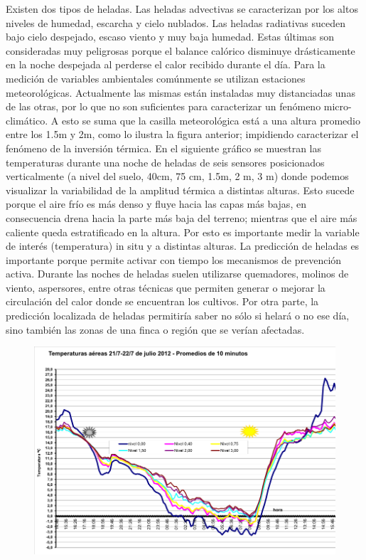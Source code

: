 \documentclass[final,a4paper]{llncs}
\begin{document}
Existen dos tipos de heladas. Las heladas advectivas se caracterizan por los
 altos niveles de humedad, escarcha y cielo nublados. Las heladas radiativas suceden 
 bajo cielo despejado, escaso viento y muy baja humedad. Estas últimas son consideradas muy peligrosas
 porque el balance calórico disminuye drásticamente en la noche despejada al perderse el 
 calor recibido durante el día. Para la medición de variables ambientales comúnmente se utilizan estaciones meteorológicas. Actualmente las mismas están instaladas muy distanciadas unas de las otras, por lo que no son suficientes para 
caracterizar un fenómeno micro-climático. A esto se suma que la casilla meteorológica está
a una altura promedio entre los 1.5m y 2m, como lo ilustra la figura\cite{saavedraTesis} anterior; impidiendo
 caracterizar el fenómeno de la inversión térmica. En el siguiente gráfico \cite{pid-fca-uncu-dataset}
 se muestran las temperaturas durante una noche de heladas de seis sensores 
posicionados verticalmente (a nivel del suelo, 40cm, 75 cm, 1.5m, 2 m, 3 m) donde 
podemos visualizar la variabilidad de la amplitud térmica a distintas alturas. 
Esto sucede porque el aire frío es más denso y fluye hacia las capas más bajas, 
en consecuencia drena hacia la parte más baja del terreno; mientras que 
el aire más caliente queda estratificado en la 
altura. Por esto es importante medir la variable de interés (temperatura) in situ y a distintas
alturas.
La predicción de heladas es importante porque permite activar con tiempo los mecanismos de 
prevención activa. Durante las noches de heladas suelen utilizarse quemadores, molinos de viento,
aspersores, entre otras técnicas que permiten generar o mejorar la circulación del calor donde 
se encuentran los cultivos. Por otra parte, la predicción localizada de heladas permitiría 
saber no sólo si helará o no ese día,
sino también las zonas de una finca o región que se verían afectadas.

\begin{figure}[h]
\includegraphics[width=0.99\columnwidth]{grafico.png}
\end{figure}\label{fig:T3-result}
\end{document}
